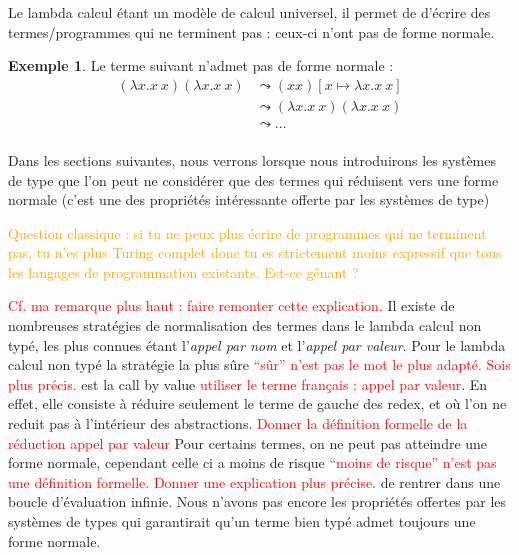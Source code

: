 \documentclass {article}
\theoremstyle{definition}
\newtheorem{example}{Exemple}
\theoremstyle{remark}
\newcommand{\todo}[1]{\textcolor{red}{#1}}
\newcommand{\attention}[1]{\textcolor{orange}{#1}}
\begin{document}
Le lambda calcul étant un modèle de calcul universel, il permet de 
d'écrire des termes/programmes qui ne terminent pas : ceux-ci n'ont pas 
de forme normale. 

\begin{example}
 
  Le terme suivant n'admet pas de forme normale :
  \begin{align*}
  (\lambda x. x\: x) (\lambda x. x\: x) &\leadsto (x x)[x \mapsto \lambda x. x\: x] \\
                                        &\leadsto (\lambda x. x\: x) (\lambda x. x\: x) \\
                                        &\leadsto \ldots \\
  \end{align*}
\end{example}
Dans les sections suivantes, nous verrons lorsque nous introduirons
les systèmes de type que l'on peut ne considérer que des termes qui
réduisent vers une forme normale (c'est une des propriétés
intéressante offerte par les systèmes de type)

\attention{Question classique : si tu ne peux plus écrire de
  programmes qui ne terminent pas, tu n'es plus Turing complet donc tu
  es strictement moins expressif que tous les langages de
  programmation existants. Est-ce gênant ?}

\todo{Cf. ma remarque plus haut : faire remonter cette explication.}
Il existe de nombreuses stratégies de normalisation des termes dans le
lambda calcul non typé, les plus connues étant l'\emph{appel par nom}
et l'\emph{appel par valeur}.  Pour le lambda calcul non typé la
stratégie la plus sûre \todo{``sûr'' n'est pas le mot le plus
  adapté. Sois plus précis.} est la call by value \todo{utiliser le
  terme français : appel par valeur}.  En effet, elle consiste à
réduire seulement le terme de gauche des redex, et où l'on ne reduit
pas à l'intérieur des abstractions. \todo{Donner la définition
  formelle de la réduction appel par valeur} Pour certains termes, on
ne peut pas atteindre une forme normale, cependant celle ci a moins de
risque \todo{``moins de risque'' n'est pas une définition
  formelle. Donner une explication plus précise.} de rentrer dans une
boucle d'évaluation infinie. Nous n'avons pas encore les propriétés
offertes par les systèmes de types qui garantirait qu'un terme bien
typé admet toujours une forme normale.
\end{document}
